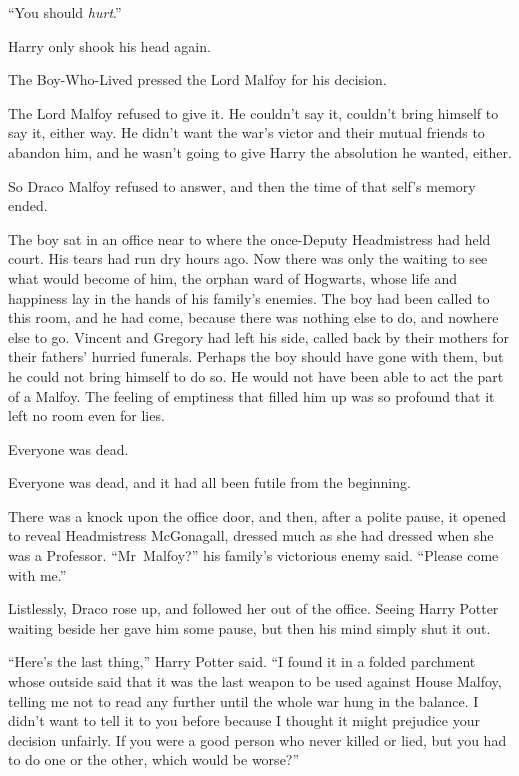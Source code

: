 “You should \emph{hurt}.”

Harry only shook his head again.

The Boy-Who-Lived pressed the Lord Malfoy for his decision.

The Lord Malfoy refused to give it. He couldn’t say it, couldn’t bring himself to say it, either way. He didn’t want the war’s victor and their mutual friends to abandon him, and he wasn’t going to give Harry the absolution he wanted, either.

So Draco Malfoy refused to answer, and then the time of that self’s memory ended.

\later

The boy sat in an office near to where the once-Deputy Headmistress had held court. His tears had run dry hours ago. Now there was only the waiting to see what would become of him, the orphan ward of Hogwarts, whose life and happiness lay in the hands of his family’s enemies. The boy had been called to this room, and he had come, because there was nothing else to do, and nowhere else to go. Vincent and Gregory had left his side, called back by their mothers for their fathers’ hurried funerals. Perhaps the boy should have gone with them, but he could not bring himself to do so. He would not have been able to act the part of a Malfoy. The feeling of emptiness that filled him up was so profound that it left no room even for lies.

Everyone was dead.

Everyone was dead, and it had all been futile from the beginning.

There was a knock upon the office door, and then, after a polite pause, it opened to reveal Headmistress McGonagall, dressed much as she had dressed when she was a Professor. “Mr~Malfoy?” his family’s victorious enemy said. “Please come with me.”

Listlessly, Draco rose up, and followed her out of the office. Seeing Harry Potter waiting beside her gave him some pause, but then his mind simply shut it out.

“Here’s the last thing,” Harry Potter said. “I found it in a folded parchment whose outside said that it was the last weapon to be used against House Malfoy, telling me not to read any further until the whole war hung in the balance. I didn’t want to tell it to you before because I thought it might prejudice your decision unfairly. If you were a good person who never killed or lied, but you had to do one or the other, which would be worse?”

